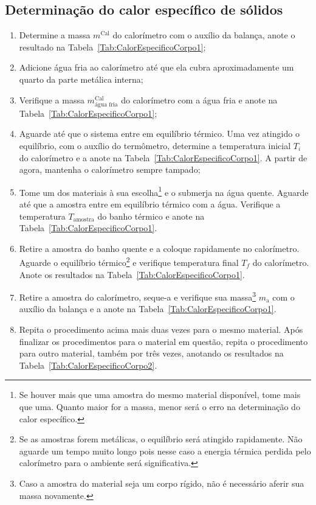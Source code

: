 \subsection{Determinação do calor específico de sólidos}

\begin{enumerate}
	\item Determine a massa $m^{\text{Cal}}$ do calorímetro com o auxílio da balança, anote o resultado na Tabela~\ref{Tab:CalorEspecificoCorpo1};
	\item Adicione água fria ao calorímetro até que ela cubra aproximadamente um quarto da parte metálica interna;
	\item Verifique a massa $m^{\text{Cal}}_{\text{água fria}}$ do calorímetro com a água fria e anote na Tabela~\ref{Tab:CalorEspecificoCorpo1};
	\item Aguarde até que o sistema entre em equilíbrio térmico. Uma vez atingido o equilíbrio, com o auxílio do termômetro, determine a temperatura inicial $T_i$ do calorímetro e a anote na Tabela~\ref{Tab:CalorEspecificoCorpo1}. A partir de agora, mantenha o calorímetro sempre tampado;
	\item Tome um dos materiais à sua escolha\footnote{Se houver mais que uma amostra do mesmo material disponível, tome mais que uma. Quanto maior for a massa, menor será o erro na determinação do calor específico.} e o submerja na água quente. Aguarde até que a amostra entre em equilíbrio térmico com a água. Verifique a temperatura $T_{\text{amostra}}$ do banho térmico e anote na Tabela~\ref{Tab:CalorEspecificoCorpo1}.
	\item Retire a amostra do banho quente e a coloque rapidamente no calorímetro. Aguarde o equilíbrio térmico\footnote{Se as amostras forem metálicas, o equilíbrio será atingido rapidamente. Não aguarde um tempo muito longo pois nesse caso a energia térmica perdida pelo calorímetro para o ambiente será significativa.} e verifique temperatura final $T_f$ do calorímetro. Anote os resultados na Tabela~\ref{Tab:CalorEspecificoCorpo1}.
	\item Retire a amostra do calorímetro, seque-a e verifique sua massa\footnote{Caso a amostra do material seja um corpo rígido, não é necessário aferir sua massa novamente.} $m_{\text{a}}$ com o auxílio da balança e a anote na Tabela~\ref{Tab:CalorEspecificoCorpo1}.
	\item Repita o procedimento acima mais duas vezes para o mesmo material. Após finalizar os procedimentos para o material em questão, repita o procedimento para outro material, também por três vezes, anotando os resultados na Tabela~\ref{Tab:CalorEspecificoCorpo2}.
\end{enumerate}

